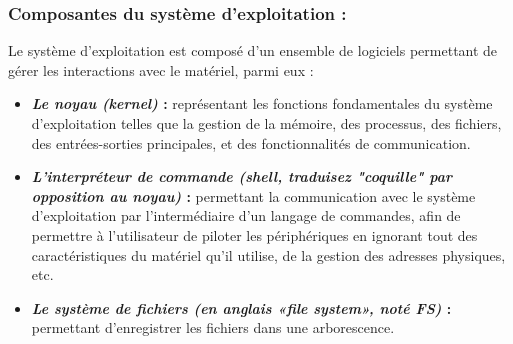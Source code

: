 		\subsubsection*{Composantes du système d'exploitation :}
			Le système d'exploitation est composé d'un ensemble de logiciels permettant de gérer les interactions avec le matériel, parmi eux :
			\begin{itemize}
				\item \textbf{\textit{Le noyau (kernel) }:} représentant les fonctions fondamentales du système d'exploitation telles que la gestion de la mémoire, des processus, des fichiers, des entrées-sorties principales, et des fonctionnalités de communication.
				\item \textbf{\textit{L'interpréteur de commande (shell, traduisez "coquille" par opposition au noyau) }:} permettant la communication avec le système d'exploitation par l'intermédiaire d'un langage de commandes, afin de permettre à l'utilisateur de piloter les périphériques en ignorant tout des caractéristiques du matériel qu'il utilise, de la gestion des adresses physiques, etc.
				\item \textbf{\textit{Le système de fichiers (en anglais «file system», noté FS) }:} permettant d'enregistrer les fichiers dans une arborescence.
			\end{itemize}
		
